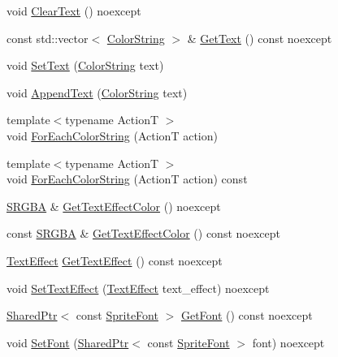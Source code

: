 \begin{DoxyCompactItemize}
\item 
void \hyperlink{classmage_1_1_sprite_text_add6f3e1150dc041d999dba772e43be14}{Clear\+Text} () noexcept
\item 
const std\+::vector$<$ \hyperlink{classmage_1_1_color_string}{Color\+String} $>$ \& \hyperlink{classmage_1_1_sprite_text_a035a18c8c388649f38a6a62e3cbcc18a}{Get\+Text} () const noexcept
\item 
void \hyperlink{classmage_1_1_sprite_text_a6853a914502bb28cfc4dc14160345542}{Set\+Text} (\hyperlink{classmage_1_1_color_string}{Color\+String} text)
\item 
void \hyperlink{classmage_1_1_sprite_text_ae401ba9ddbb1e53e84fb24f4bd4f11bb}{Append\+Text} (\hyperlink{classmage_1_1_color_string}{Color\+String} text)
\item 
{\footnotesize template$<$typename ActionT $>$ }\\void \hyperlink{classmage_1_1_sprite_text_ad975957b908ad3926ace75fb60ff4474}{For\+Each\+Color\+String} (ActionT action)
\item 
{\footnotesize template$<$typename ActionT $>$ }\\void \hyperlink{classmage_1_1_sprite_text_abc70368fd800a82cbd1ec31f51d4db17}{For\+Each\+Color\+String} (ActionT action) const
\item 
\hyperlink{structmage_1_1_s_r_g_b_a}{S\+R\+G\+BA} \& \hyperlink{classmage_1_1_sprite_text_a0b8d0df75efa9dd9e666b68db6ee71b5}{Get\+Text\+Effect\+Color} () noexcept
\item 
const \hyperlink{structmage_1_1_s_r_g_b_a}{S\+R\+G\+BA} \& \hyperlink{classmage_1_1_sprite_text_af9f15b5b215e1433cee2152a5ce5e299}{Get\+Text\+Effect\+Color} () const noexcept
\item 
\hyperlink{classmage_1_1_sprite_text_a4d3101d037b6fe4247d77b5fbf811dd2}{Text\+Effect} \hyperlink{classmage_1_1_sprite_text_a1f5b83df9a7332ac3774a038df169847}{Get\+Text\+Effect} () const noexcept
\item 
void \hyperlink{classmage_1_1_sprite_text_ae258a31796c3fa6b8c31e0b98010a0ef}{Set\+Text\+Effect} (\hyperlink{classmage_1_1_sprite_text_a4d3101d037b6fe4247d77b5fbf811dd2}{Text\+Effect} text\+\_\+effect) noexcept
\item 
\hyperlink{namespacemage_a1e01ae66713838a7a67d30e44c67703e}{Shared\+Ptr}$<$ const \hyperlink{classmage_1_1_sprite_font}{Sprite\+Font} $>$ \hyperlink{classmage_1_1_sprite_text_aa1aab1690f37220babce2639463bd7d5}{Get\+Font} () const noexcept
\item 
void \hyperlink{classmage_1_1_sprite_text_a46235c90d3fc9872c2342cd17eaa9e89}{Set\+Font} (\hyperlink{namespacemage_a1e01ae66713838a7a67d30e44c67703e}{Shared\+Ptr}$<$ const \hyperlink{classmage_1_1_sprite_font}{Sprite\+Font} $>$ font) noexcept
\end{DoxyCompactItemize}
